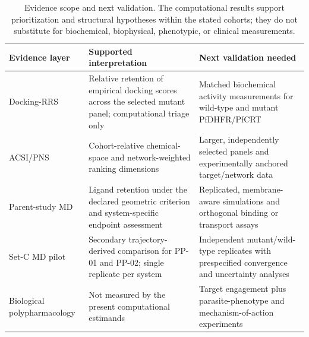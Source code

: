 \begin{table}[htbp]
\centering
\scriptsize
\caption{Evidence scope and next validation. The computational results support prioritization and structural hypotheses within the stated cohorts; they do not substitute for biochemical, biophysical, phenotypic, or clinical measurements.}
\label{tab:s13_evidence_scope}
\begin{tabularx}{\textwidth}{>{\raggedright\arraybackslash}p{} >{\raggedright\arraybackslash}p{} >{\raggedright\arraybackslash}X}
\toprule
Evidence layer & Supported interpretation & Next validation needed \\
\midrule
Docking-RRS & Relative retention of empirical docking scores across the selected mutant panel; computational triage only & Matched biochemical activity measurements for wild-type and mutant PfDHFR/PfCRT \\
ACSI/PNS & Cohort-relative chemical-space and network-weighted ranking dimensions & Larger, independently selected panels and experimentally anchored target/network data \\
Parent-study MD & Ligand retention under the declared geometric criterion and system-specific endpoint assessment & Replicated, membrane-aware simulations and orthogonal binding or transport assays \\
Set-C MD pilot & Secondary trajectory-derived comparison for PP-01 and PP-02; single replicate per system & Independent mutant/wild-type replicates with prespecified convergence and uncertainty analyses \\
Biological polypharmacology & Not measured by the present computational estimands & Target engagement plus parasite-phenotype and mechanism-of-action experiments \\
\bottomrule
\end{tabularx}
\end{table}
